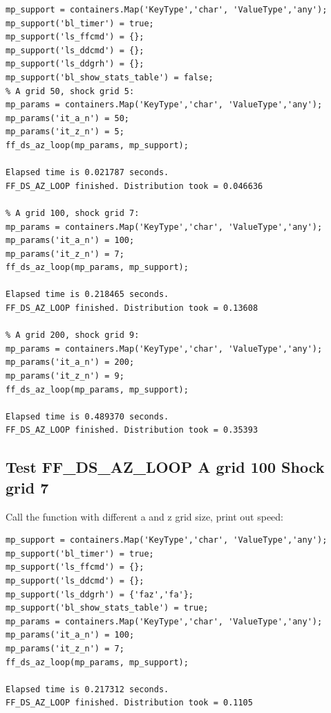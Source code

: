 \documentclass[
]{book}
\begin{document}
\begin{verbatim}
mp_support = containers.Map('KeyType','char', 'ValueType','any');
mp_support('bl_timer') = true;
mp_support('ls_ffcmd') = {};
mp_support('ls_ddcmd') = {};
mp_support('ls_ddgrh') = {};
mp_support('bl_show_stats_table') = false;
% A grid 50, shock grid 5:
mp_params = containers.Map('KeyType','char', 'ValueType','any');
mp_params('it_a_n') = 50;
mp_params('it_z_n') = 5;
ff_ds_az_loop(mp_params, mp_support);

Elapsed time is 0.021787 seconds.
FF_DS_AZ_LOOP finished. Distribution took = 0.046636

% A grid 100, shock grid 7:
mp_params = containers.Map('KeyType','char', 'ValueType','any');
mp_params('it_a_n') = 100;
mp_params('it_z_n') = 7;
ff_ds_az_loop(mp_params, mp_support);

Elapsed time is 0.218465 seconds.
FF_DS_AZ_LOOP finished. Distribution took = 0.13608

% A grid 200, shock grid 9:
mp_params = containers.Map('KeyType','char', 'ValueType','any');
mp_params('it_a_n') = 200;
mp_params('it_z_n') = 9;
ff_ds_az_loop(mp_params, mp_support);

Elapsed time is 0.489370 seconds.
FF_DS_AZ_LOOP finished. Distribution took = 0.35393
\end{verbatim}

\hypertarget{test-ff_ds_az_loop-a-grid-100-shock-grid-7}{%
\subsection{Test FF\_DS\_AZ\_LOOP A grid 100 Shock grid 7}\label{test-ff_ds_az_loop-a-grid-100-shock-grid-7}}

Call the function with different a and z grid size, print out speed:

\begin{verbatim}
mp_support = containers.Map('KeyType','char', 'ValueType','any');
mp_support('bl_timer') = true;
mp_support('ls_ffcmd') = {};
mp_support('ls_ddcmd') = {};
mp_support('ls_ddgrh') = {'faz','fa'};
mp_support('bl_show_stats_table') = true;
mp_params = containers.Map('KeyType','char', 'ValueType','any');
mp_params('it_a_n') = 100;
mp_params('it_z_n') = 7;
ff_ds_az_loop(mp_params, mp_support);

Elapsed time is 0.217312 seconds.
FF_DS_AZ_LOOP finished. Distribution took = 0.1105
\end{verbatim}
\end{document}
